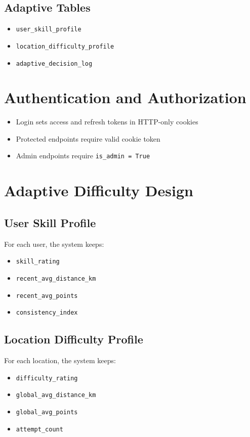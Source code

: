 \documentclass[12pt,a4paper]{article}
\begin{document}
\subsection{Adaptive Tables}
\begin{itemize}[noitemsep]
  \item \texttt{user\_skill\_profile}
  \item \texttt{location\_difficulty\_profile}
  \item \texttt{adaptive\_decision\_log}
\end{itemize}

\section{Authentication and Authorization}
\begin{itemize}[noitemsep]
  \item Login sets access and refresh tokens in HTTP-only cookies
  \item Protected endpoints require valid cookie token
  \item Admin endpoints require \texttt{is\_admin = True}
\end{itemize}

\section{Adaptive Difficulty Design}
\subsection{User Skill Profile}
For each user, the system keeps:
\begin{itemize}[noitemsep]
  \item \texttt{skill\_rating}
  \item \texttt{recent\_avg\_distance\_km}
  \item \texttt{recent\_avg\_points}
  \item \texttt{consistency\_index}
\end{itemize}

\subsection{Location Difficulty Profile}
For each location, the system keeps:
\begin{itemize}[noitemsep]
  \item \texttt{difficulty\_rating}
  \item \texttt{global\_avg\_distance\_km}
  \item \texttt{global\_avg\_points}
  \item \texttt{attempt\_count}
\end{itemize}
\end{document}
